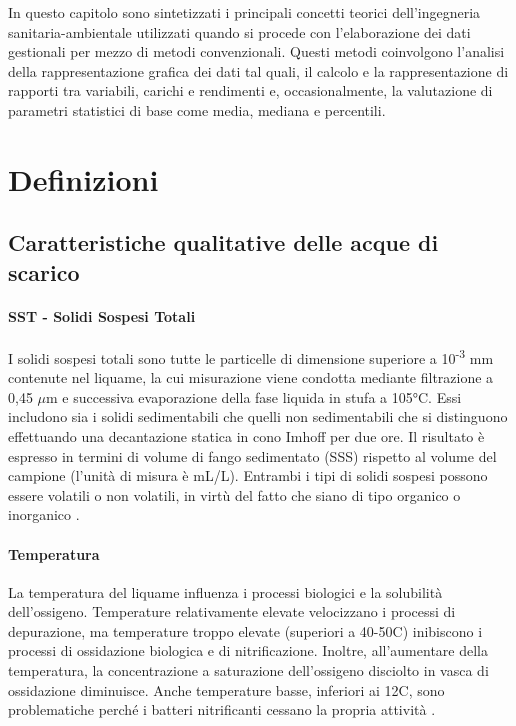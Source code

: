 In questo capitolo sono sintetizzati i principali concetti teorici dell'ingegneria sanitaria-ambientale utilizzati quando si procede con l'elaborazione dei dati gestionali per mezzo di metodi convenzionali. Questi metodi coinvolgono l'analisi della rappresentazione grafica dei dati tal quali, il calcolo e la rappresentazione di rapporti tra variabili, carichi e rendimenti e, occasionalmente, la valutazione di parametri statistici di base come media, mediana e percentili.

\section{Definizioni}
\subsection{Caratteristiche qualitative delle acque di scarico}

\paragraph*{SST - Solidi Sospesi Totali}
I solidi sospesi totali sono tutte le particelle di dimensione superiore a 10\textsuperscript{-3} mm contenute nel liquame, la cui misurazione viene condotta mediante filtrazione a 0,45 $\mu$m e successiva evaporazione della fase liquida in stufa a 105°C. Essi includono sia i solidi sedimentabili che quelli non sedimentabili che si distinguono effettuando una decantazione statica in cono Imhoff per due ore. Il risultato è espresso in termini di volume di fango sedimentato (SSS) rispetto al volume del campione (l'unità di misura è mL/L). Entrambi i tipi di solidi sospesi possono essere volatili o non volatili, in virtù del fatto che siano di tipo organico o inorganico \cite{collivignarelli2012ingegneria}.


\paragraph*{Temperatura}
La temperatura del liquame influenza i processi biologici e la solubilità dell'ossigeno. Temperature relativamente elevate velocizzano i processi di depurazione, ma temperature troppo elevate (superiori a 40-50\textdegree C) inibiscono i processi di ossidazione biologica e di nitrificazione. Inoltre, all'aumentare della temperatura, la concentrazione a saturazione dell'ossigeno disciolto in vasca di ossidazione diminuisce. Anche temperature basse, inferiori ai 12\textdegree C, sono problematiche perché i batteri nitrificanti cessano la propria attività \cite{bonomo2008trattamenti}.  

